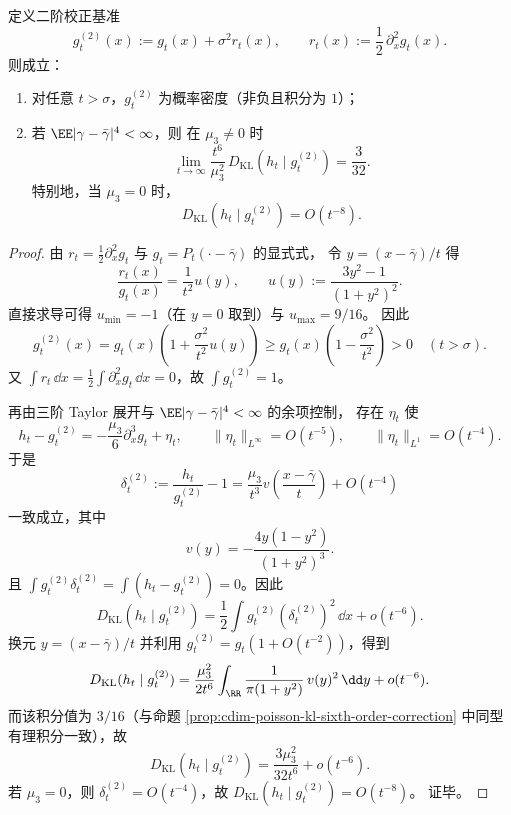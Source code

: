 \begin{theorem}\label{thm:cdim-poisson-second-order-edgeworth-benchmark}
定义二阶校正基准
\[
g_t^{(2)}(x):=g_t(x)+\sigma^2 r_t(x),
\qquad
r_t(x):=\frac12\,\partial_x^2 g_t(x).
\]
则成立：
\begin{enumerate}
  \item 对任意 \(t>\sigma\)，\(g_t^{(2)}\) 为概率密度（非负且积分为 \(1\)）；
  \item 若 \(\EE|\gamma-\bar\gamma|^4<\infty\)，则
  在 \(\mu_3\neq 0\) 时
  \[
  \lim_{t\to\infty}\frac{t^6}{\mu_3^2}\,D_{\mathrm{KL}}(h_t\mid g_t^{(2)})=\frac{3}{32}.
  \]
  特别地，当 \(\mu_3=0\) 时，
  \[
  D_{\mathrm{KL}}(h_t\mid g_t^{(2)})=O(t^{-8}).
  \]
\end{enumerate}
\end{theorem}
\begin{proof}
由 \(r_t=\frac12\partial_x^2 g_t\) 与 \(g_t=P_t(\cdot-\bar\gamma)\) 的显式式，
令 \(y=(x-\bar\gamma)/t\) 得
\[
\frac{r_t(x)}{g_t(x)}
=\frac{1}{t^2}u(y),\qquad
u(y):=\frac{3y^2-1}{(1+y^2)^2}.
\]
直接求导可得 \(u_{\min}=-1\)（在 \(y=0\) 取到）与 \(u_{\max}=9/16\)。
因此
\[
g_t^{(2)}(x)
=g_t(x)\!\left(1+\frac{\sigma^2}{t^2}u(y)\right)
\ge g_t(x)\!\left(1-\frac{\sigma^2}{t^2}\right)>0
\quad(t>\sigma).
\]
又 \(\int r_t\,\dd x=\frac12\int \partial_x^2 g_t\,\dd x=0\)，故 \(\int g_t^{(2)}=1\)。

再由三阶 Taylor 展开与 \(\EE|\gamma-\bar\gamma|^4<\infty\) 的余项控制，
存在 \(\eta_t\) 使
\[
h_t-g_t^{(2)}
=-\frac{\mu_3}{6}\partial_x^3 g_t+\eta_t,
\qquad
\|\eta_t\|_{L^\infty}=O(t^{-5}),
\qquad
\|\eta_t\|_{L^1}=O(t^{-4}).
\]
于是
\[
\delta_t^{(2)}:=\frac{h_t}{g_t^{(2)}}-1
=\frac{\mu_3}{t^3}v\!\left(\frac{x-\bar\gamma}{t}\right)+O(t^{-4})
\]
一致成立，其中
\[
v(y)=-\frac{4y(1-y^2)}{(1+y^2)^3}.
\]
且 \(\int g_t^{(2)}\delta_t^{(2)}=\int(h_t-g_t^{(2)})=0\)。因此
\[
D_{\mathrm{KL}}(h_t\mid g_t^{(2)})
=\frac12\int g_t^{(2)}(\delta_t^{(2)})^2\,\dd x+o(t^{-6}).
\]
换元 \(y=(x-\bar\gamma)/t\) 并利用 \(g_t^{(2)}=g_t(1+O(t^{-2}))\)，得到
\[
D_{\mathrm{KL}}(h_t\mid g_t^{(2)})
=\frac{\mu_3^2}{2t^6}\int_{\RR}\frac{1}{\pi(1+y^2)}\,v(y)^2\,\dd y+o(t^{-6}).
\]
而该积分值为 \(3/16\)（与命题 \ref{prop:cdim-poisson-kl-sixth-order-correction} 中同型有理积分一致），故
\[
D_{\mathrm{KL}}(h_t\mid g_t^{(2)})
=\frac{3\mu_3^2}{32t^6}+o(t^{-6}).
\]
若 \(\mu_3=0\)，则 \(\delta_t^{(2)}=O(t^{-4})\)，故
\(
D_{\mathrm{KL}}(h_t\mid g_t^{(2)})=O(t^{-8})
\)。
证毕。
\end{proof}

